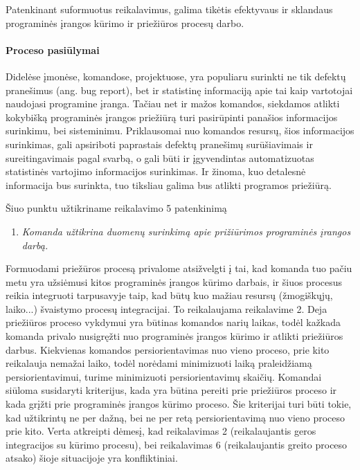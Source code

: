 \documentclass[12pt, a4paper, lithuanian, final]{article}
\begin{document}
Patenkinant suformuotus reikalavimus, galima tikėtis efektyvaus ir sklandaus programinės įrangos kūrimo ir priežiūros procesų darbo.

\paragraph{Proceso pasiūlymai}
Didelėse įmonėse, komandose, projektuose, yra populiaru surinkti ne tik defektų pranešimus (ang. bug report), bet ir statistinę informaciją apie tai kaip vartotojai naudojasi programine įranga.
Tačiau net ir mažos komandos, siekdamos atlikti kokybišką programinės įrangos priežiūrą turi pasirūpinti panašios informacijos surinkimu, bei sisteminimu.
Priklausomai nuo komandos resursų, šios informacijos surinkimas, gali apsiriboti paprastais defektų pranešimų surūšiavimais ir sureitingavimais pagal svarbą, o gali būti ir įgyvendintas automatizuotas statistinės vartojimo informacijos surinkimas.
Ir žinoma, kuo detalesnė informacija bus surinkta, tuo tiksliau galima bus atlikti programos priežiūrą.

Šiuo punktu užtikriname reikalavimo 5 patenkinimą

\begin{enumerate}
	\setcounter{enumi}{0}
	\item \textit{Komanda užtikrina duomenų surinkimą apie prižiūrimos programinės įrangos darbą.}
	\setcounter{reqList}{\theenumi}
\end{enumerate}


Formuodami priežūros procesą privalome atsižvelgti į tai, kad komanda tuo pačiu metu yra užsiėmusi kitos programinės įrangos kūrimo darbais, ir šiuos procesus reikia integruoti tarpusavyje taip, kad būtų kuo mažiau resursų (žmogiškųjų, laiko...) švaistymo procesų integracijai.
To reikalaujama reikalavime 2.
Deja priežiūros proceso vykdymui yra būtinas komandos narių laikas, todėl kažkada komanda privalo nusigręžti nuo programinės įrangos kūrimo ir atlikti priežiūros darbus.
Kiekvienas komandos persiorientavimas nuo vieno proceso, prie kito reikalauja nemažai laiko, todėl norėdami minimizuoti laiką praleidžiamą persiorientavimui, turime minimizuoti persiorientavimų skaičių. 
Komandai siūloma susidaryti kriterijus, kada yra būtina pereiti prie priežiūros proceso ir kada grįžti prie programinės įrangos kūrimo proceso.
Šie kriterijai turi būti tokie, kad užtikrintų ne per dažną, bei ne per retą persiorientavimą nuo vieno proceso prie kito.
Verta atkreipti dėmesį, kad reikalavimas 2 (reikalaujantis geros integracijos su kūrimo procesu), bei reikalavimas 6 (reikalaujantis greito proceso atsako) šioje situacijoje yra konfliktiniai.
\end{document}
